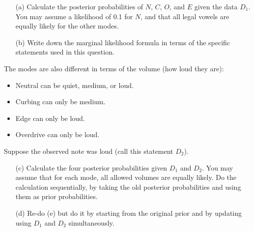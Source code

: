 \documentclass[a4paper, 12pt]{article}
\begin{document}
\begin{enumerate}
\item[(a)] Calculate the posterior
           probabilities of $N$, $C$, $O$, and $E$ given the data $D_1$.
           You may assume a likelihood of 0.1 for $N$, and that all legal
           vowels are equally likely for the other modes.
\item[(b)] Write down the marginal likelihood formula in terms of the
           specific statements used in this question.
\end{enumerate}

The modes are also different in terms of the volume
(how loud they are):
\begin{itemize}
\item Neutral can be quiet, medium, or loud.
\item Curbing can only be medium.
\item Edge can only be loud.
\item Overdrive can only be loud.
\end{itemize}
Suppose the observed note was loud (call this statement $D_2$).

\begin{enumerate}
\item[(c)] Calculate the four posterior probabilities given
           $D_1$ and $D_2$. You may assume that for each mode,
           all allowed volumes are equally likely. Do the calculation
           sequentially, by taking the old posterior probabilities and
           using them as prior probabilities.
\item[(d)] Re-do (e) but do it by starting from the original prior and
           by updating using $D_1$ and $D_2$ simultaneously.
\end{enumerate}
\end{document}
